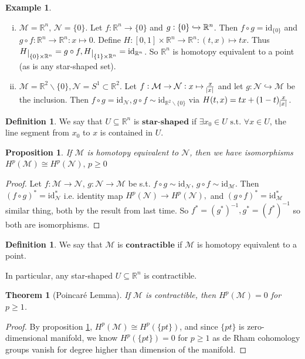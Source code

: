 \documentclass[10pt]{article}
\theoremstyle{plain}
\newtheorem{theorem}{Theorem}[section]
\newtheorem{prop}[thm]{Proposition}
\theoremstyle{definition}
\newtheorem{defn}[thm]{Definition} %
\newtheorem{exmp}[thm]{Example} %
\newcommand{\st}{\text{ s.t. }}
\newcommand{\id}{\text{id}}
\newcommand{\Real}{\mathbb{R}}
\newcommand{\man}{\mathcal{M}}
\newcommand{\nan}{\mathcal{N}}
\def\restrict#1{\raise-.5ex\hbox{\ensuremath|}_{#1}}
\newcommand{\cohomman}[1]{H^{#1}(\man)}
\newcommand{\cohomnan}[1]{H^{#1}(\nan)}
\newcommand{\inter}{\left[0,1\right]}
\begin{document}
\begin{exmp}
\begin{enumerate}[(i)]
    \item $\man = \Real ^n, \, \nan = \{0\}.$ Let $f:\Real^n \to \{0\}$ and $g:\{0\} \xhookrightarrow{} \Real^n$. Then $f\circ g = \id_{\{0\}}$ and $g\circ f : \Real^n \to \Real^n : x \mapsto 0$. Define $H: \inter \times \Real^n \to \Real ^n : (t,x) \mapsto tx$. Thus $H\restrict{\{0\}\times \Real^n} = g\circ f , H\restrict{\{1\}\times \Real^n} = \id_{\Real^n}$. So $\Real^n$ is homotopy equivalent to a point (as is any star-shaped set).
    \item $\man = \Real^2\backslash \{0\}, \nan = S^1 \subset \Real^2$. Let $f: \man \to \nan: x\mapsto \frac{x}{\abs{x}}$ and let $g: \nan \hookrightarrow \man$ be the inclusion. Then $f\circ g = \id_{\nan}, g\circ f \sim \id_{\Real^2\backslash\{0\}}$ via $H(t,x) = tx + (1-t) \frac{x}{\abs{x}}$.
\end{enumerate}
\end{exmp}
\begin{defn}
We say that $U\subseteq \Real^n$ is $\textbf{star-shaped}$ if $\exists x_0 \in U \st \forall x\in U $, the line segment from $x_0$ to $x$ is contained in $U$.
\end{defn}
\begin{prop}\label{prop:homotopyequivalenceimpliescohomologyequivalence}
If $\man $ is homotopy equivalent to $\nan$, then we have isomorphisms $\cohomman{p} \cong \cohomnan{p}, \, p\geq 0$
\end{prop}
\begin{proof}
Let $f: \man \to \nan, \, g:\nan\to \man $ be s.t. $f\circ g \sim \id _{\nan}, \, g\circ f \sim \id_{\man}$. Then $(f\circ g)^* = \id_\nan^*$ i.e. identity map $\cohomnan{p} \to \cohomnan{p},$ and $(g\circ f)^* = \id_\man^*$ similar thing, both by the result from last time. So $f^* = (g^*)^{-1}, g^* = (f^*)^{-1}$ so both are isomorphisms.
\end{proof}
\begin{defn}
We say that $\man$ is $\textbf{contractible}$ if $\man$ is homotopy equivalent to a point.
\end{defn}\noindent
In particular, any star-shaped $U \subseteq \Real^n$ is contractible.
\begin{theorem}[Poincaré Lemma]
If $\man$ is contractible, then $\cohomman{p} = 0 $ for $p\geq 1$.
\end{theorem}
\begin{proof}
By proposition \ref{prop:homotopyequivalenceimpliescohomologyequivalence}, $\cohomman{p} \cong H^p(\{{pt}\})$, and since $\{pt\}$ is zero-dimensional manifold, we know $H^p(\{pt\}) = 0$ for $p\geq 1$ as de Rham cohomology groups vanish for degree higher than dimension of the manifold.
\end{proof}
\end{document}
